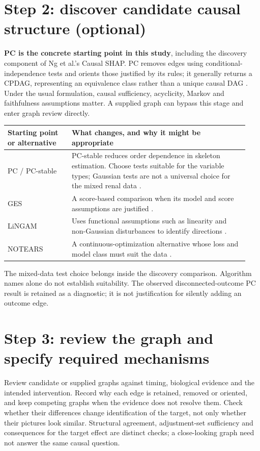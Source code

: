 \documentclass[11pt,letterpaper]{article}
\begin{document}
\section*{Step 2: discover candidate causal structure (optional)}

\textbf{PC is the concrete starting point in this study}, including the discovery component of Ng et al.'s Causal SHAP. PC removes edges using conditional-independence tests and orients those justified by its rules; it generally returns a CPDAG, representing an equivalence class rather than a unique causal DAG \citep{Kalisch2012,Ng2025}. Under the usual formulation, causal sufficiency, acyclicity, Markov and faithfulness assumptions matter. A supplied graph can bypass this stage and enter graph review directly.

\begingroup\small\setlength{\tabcolsep}{5pt}
\begin{longtable}{@{}L{0.25\linewidth}L{0.69\linewidth}@{}}
\toprule Starting point or alternative & What changes, and why it might be appropriate\\\midrule\endhead
PC / PC-stable & PC-stable reduces order dependence in skeleton estimation. Choose tests suitable for the variable types; Gaussian tests are not a universal choice for the mixed renal data \citep{ColomboMaathuis2014}.\\[4pt]
GES & A score-based comparison when its model and score assumptions are justified \citep{Chickering2002}.\\[4pt]
LiNGAM & Uses functional assumptions such as linearity and non-Gaussian disturbances to identify directions \citep{Shimizu2006}.\\[4pt]
NOTEARS & A continuous-optimization alternative whose loss and model class must suit the data \citep{Zheng2018}.\\
\bottomrule
\end{longtable}\endgroup

The mixed-data test choice belongs inside the discovery comparison. Algorithm names alone do not establish suitability. The observed disconnected-outcome PC result is retained as a diagnostic; it is not justification for silently adding an outcome edge.

\clearpage
\section*{Step 3: review the graph and specify required mechanisms}

Review candidate or supplied graphs against timing, biological evidence and the intended intervention. Record why each edge is retained, removed or oriented, and keep competing graphs when the evidence does not resolve them. Check whether their differences change identification of the target, not only whether their pictures look similar. Structural agreement, adjustment-set sufficiency and consequences for the target effect are distinct checks; a close-looking graph need not answer the same causal question.
\end{document}
